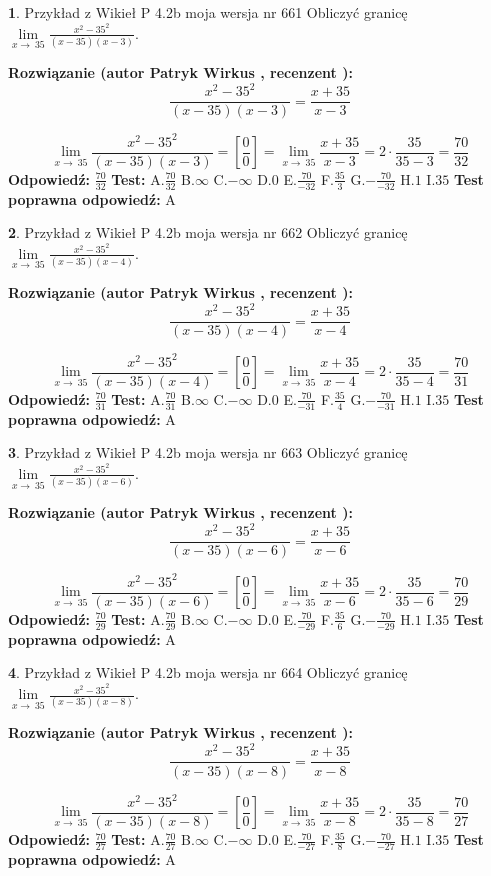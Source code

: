 \documentclass[12pt, a4paper]{article}
\theoremstyle{definition} %
\newtheorem{zad}{}
\newcommand{\zadStart}[1]{\begin{zad}#1\newline}
\newcommand{\zadStop}{\end{zad}}
\newcommand{\rozwStart}[2]{\noindent \textbf{Rozwiązanie (autor #1 , recenzent #2): }\newline}
\newcommand{\rozwStop}{\newline}
\newcommand{\odpStart}{\noindent \textbf{Odpowiedź:}\newline}
\newcommand{\odpStop}{\newline}
\newcommand{\testStart}{\noindent \textbf{Test:}\newline}
\newcommand{\testStop}{\newline}
\newcommand{\kluczStart}{\noindent \textbf{Test poprawna odpowiedź:}\newline}
\newcommand{\kluczStop}{\newline}
\begin{document}
\zadStart{Przykład z Wikieł P 4.2b moja wersja nr 661}
Obliczyć granicę $\lim\limits_{x\to\ 35}\frac{x^{2}-35^{2}}{(x-35)(x-3)}$.
\zadStop
\rozwStart{Patryk Wirkus}{}
$$\frac{x^{2}-35^{2}}{(x-35)(x-3)}=\frac{x+35}{x-3}$$

$$\lim\limits_{x\to\ 35}\frac{x^{2}-35^{2}}{(x-35)(x-3)}=[\frac{0}{0}]=\lim\limits_{x\to\ 35}\frac{x+35}{x-3}=2 \cdot \frac{35}{35-3} = \frac{70}{32}$$
\rozwStop
\odpStart
$\frac{70}{32}$
\odpStop
\testStart
A.$\frac{70}{32}$
B.$\infty$
C.$-\infty$
D.$0$
E.$\frac{70}{-32}$
F.$\frac{35}{3}$
G.$-\frac{70}{-32}$
H.$1$
I.$35$
\testStop
\kluczStart
A
\kluczStop



\zadStart{Przykład z Wikieł P 4.2b moja wersja nr 662}
Obliczyć granicę $\lim\limits_{x\to\ 35}\frac{x^{2}-35^{2}}{(x-35)(x-4)}$.
\zadStop
\rozwStart{Patryk Wirkus}{}
$$\frac{x^{2}-35^{2}}{(x-35)(x-4)}=\frac{x+35}{x-4}$$

$$\lim\limits_{x\to\ 35}\frac{x^{2}-35^{2}}{(x-35)(x-4)}=[\frac{0}{0}]=\lim\limits_{x\to\ 35}\frac{x+35}{x-4}=2 \cdot \frac{35}{35-4} = \frac{70}{31}$$
\rozwStop
\odpStart
$\frac{70}{31}$
\odpStop
\testStart
A.$\frac{70}{31}$
B.$\infty$
C.$-\infty$
D.$0$
E.$\frac{70}{-31}$
F.$\frac{35}{4}$
G.$-\frac{70}{-31}$
H.$1$
I.$35$
\testStop
\kluczStart
A
\kluczStop



\zadStart{Przykład z Wikieł P 4.2b moja wersja nr 663}
Obliczyć granicę $\lim\limits_{x\to\ 35}\frac{x^{2}-35^{2}}{(x-35)(x-6)}$.
\zadStop
\rozwStart{Patryk Wirkus}{}
$$\frac{x^{2}-35^{2}}{(x-35)(x-6)}=\frac{x+35}{x-6}$$

$$\lim\limits_{x\to\ 35}\frac{x^{2}-35^{2}}{(x-35)(x-6)}=[\frac{0}{0}]=\lim\limits_{x\to\ 35}\frac{x+35}{x-6}=2 \cdot \frac{35}{35-6} = \frac{70}{29}$$
\rozwStop
\odpStart
$\frac{70}{29}$
\odpStop
\testStart
A.$\frac{70}{29}$
B.$\infty$
C.$-\infty$
D.$0$
E.$\frac{70}{-29}$
F.$\frac{35}{6}$
G.$-\frac{70}{-29}$
H.$1$
I.$35$
\testStop
\kluczStart
A
\kluczStop



\zadStart{Przykład z Wikieł P 4.2b moja wersja nr 664}
Obliczyć granicę $\lim\limits_{x\to\ 35}\frac{x^{2}-35^{2}}{(x-35)(x-8)}$.
\zadStop
\rozwStart{Patryk Wirkus}{}
$$\frac{x^{2}-35^{2}}{(x-35)(x-8)}=\frac{x+35}{x-8}$$

$$\lim\limits_{x\to\ 35}\frac{x^{2}-35^{2}}{(x-35)(x-8)}=[\frac{0}{0}]=\lim\limits_{x\to\ 35}\frac{x+35}{x-8}=2 \cdot \frac{35}{35-8} = \frac{70}{27}$$
\rozwStop
\odpStart
$\frac{70}{27}$
\odpStop
\testStart
A.$\frac{70}{27}$
B.$\infty$
C.$-\infty$
D.$0$
E.$\frac{70}{-27}$
F.$\frac{35}{8}$
G.$-\frac{70}{-27}$
H.$1$
I.$35$
\testStop
\kluczStart
A
\kluczStop
\end{document}
